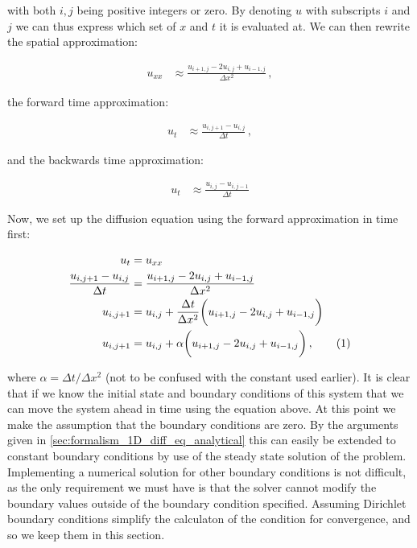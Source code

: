 \documentclass[reprint,english,notitlepage]{revtex4-1}  %
\newcommand\numberthis{\addtocounter{equation}{1}\tag{\theequation}}
\begin{document}
with both $i,j$ being positive integers or zero. By denoting $u$ with subscripts $i$ and $j$ we can thus express which set of $x$ and $t$ it is evaluated at. We can then rewrite the spatial approximation:

\begin{align*}
u_{xx} &\approx \frac{u_{i+1,j} - 2u_{i,j} + u_{i-1,j}}{\Delta x^2} \, ,
\end{align*}

the forward time approximation:

\begin{align*}
u_t &\approx \frac{u_{i,j+1} - u_{i,j}}{\Delta t} \, ,
\end{align*}

and the backwards time approximation:

\begin{align*}
u_t &\approx \frac{u_{i,j}- u_{i,j-1}}{\Delta t}
\end{align*}

Now, we set up the diffusion equation using the forward approximation in time first:

\begin{align*}
u_t &= u_{xx} \\
\frac{u_{i,j+1} - u_{i,j}}{\Delta t} &= \frac{u_{i+1,j} - 2u_{i,j} + u_{i-1,j}}{\Delta x^2}  \\
u_{i,j+1} &= u_{i,j} + \frac{\Delta t}{\Delta x^2} \bigg( u_{i+1,j} - 2u_{i,j} + u_{i-1,j} \bigg) \\
u_{i,j+1} &= u_{i,j} + \alpha \bigg( u_{i+1,j} - 2u_{i,j} + u_{i-1,j} \bigg) \, ,\numberthis \label{eq:forward_euler_method}
\end{align*}

where $\alpha = \Delta t /\Delta x^2$ (not to be confused with the constant used earlier). It is clear that if we know the initial state and boundary conditions of this system that we can move the system ahead in time using the equation above. At this point we make the assumption that the boundary conditions are zero. By the arguments given in \ref{sec:formalism_1D_diff_eq_analytical} this can easily be extended to constant boundary conditions by use of the steady state solution of the problem. Implementing a numerical solution for other boundary conditions is not difficult, as the only requirement we must have is that the solver cannot modify the boundary values outside of the boundary condition specified. Assuming Dirichlet boundary conditions simplify the calculaton of the condition for convergence, and so we keep them in this section.
\end{document}

